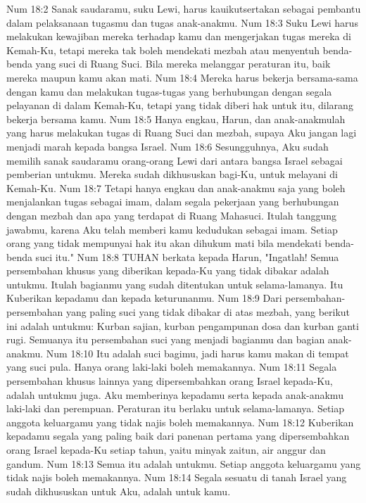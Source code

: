 Num 18:2  Sanak saudaramu, suku Lewi, harus kauikutsertakan sebagai pembantu dalam pelaksanaan tugasmu dan tugas anak-anakmu.
Num 18:3  Suku Lewi harus melakukan kewajiban mereka terhadap kamu dan mengerjakan tugas mereka di Kemah-Ku, tetapi mereka tak boleh mendekati mezbah atau menyentuh benda-benda yang suci di Ruang Suci. Bila mereka melanggar peraturan itu, baik mereka maupun kamu akan mati.
Num 18:4  Mereka harus bekerja bersama-sama dengan kamu dan melakukan tugas-tugas yang berhubungan dengan segala pelayanan di dalam Kemah-Ku, tetapi yang tidak diberi hak untuk itu, dilarang bekerja bersama kamu.
Num 18:5  Hanya engkau, Harun, dan anak-anakmulah yang harus melakukan tugas di Ruang Suci dan mezbah, supaya Aku jangan lagi menjadi marah kepada bangsa Israel.
Num 18:6  Sesungguhnya, Aku sudah memilih sanak saudaramu orang-orang Lewi dari antara bangsa Israel sebagai pemberian untukmu. Mereka sudah dikhususkan bagi-Ku, untuk melayani di Kemah-Ku.
Num 18:7  Tetapi hanya engkau dan anak-anakmu saja yang boleh menjalankan tugas sebagai imam, dalam segala pekerjaan yang berhubungan dengan mezbah dan apa yang terdapat di Ruang Mahasuci. Itulah tanggung jawabmu, karena Aku telah memberi kamu kedudukan sebagai imam. Setiap orang yang tidak mempunyai hak itu akan dihukum mati bila mendekati benda-benda suci itu."
Num 18:8  TUHAN berkata kepada Harun, "Ingatlah! Semua persembahan khusus yang diberikan kepada-Ku yang tidak dibakar adalah untukmu. Itulah bagianmu yang sudah ditentukan untuk selama-lamanya. Itu Kuberikan kepadamu dan kepada keturunanmu.
Num 18:9  Dari persembahan-persembahan yang paling suci yang tidak dibakar di atas mezbah, yang berikut ini adalah untukmu: Kurban sajian, kurban pengampunan dosa dan kurban ganti rugi. Semuanya itu persembahan suci yang menjadi bagianmu dan bagian anak-anakmu.
Num 18:10  Itu adalah suci bagimu, jadi harus kamu makan di tempat yang suci pula. Hanya orang laki-laki boleh memakannya.
Num 18:11  Segala persembahan khusus lainnya yang dipersembahkan orang Israel kepada-Ku, adalah untukmu juga. Aku memberinya kepadamu serta kepada anak-anakmu laki-laki dan perempuan. Peraturan itu berlaku untuk selama-lamanya. Setiap anggota keluargamu yang tidak najis boleh memakannya.
Num 18:12  Kuberikan kepadamu segala yang paling baik dari panenan pertama yang dipersembahkan orang Israel kepada-Ku setiap tahun, yaitu minyak zaitun, air anggur dan gandum.
Num 18:13  Semua itu adalah untukmu. Setiap anggota keluargamu yang tidak najis boleh memakannya.
Num 18:14  Segala sesuatu di tanah Israel yang sudah dikhususkan untuk Aku, adalah untuk kamu.
